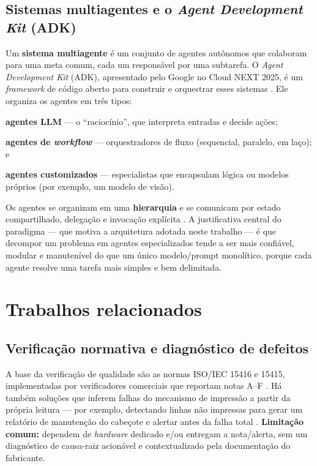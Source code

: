 \documentclass[
	article,			%
	11pt,				%
	oneside,			%
	a4paper,			%
	english,			%
	brazilian,			%
	sumario=tradicional
	]{abntex2}
\begin{document}
\subsection{Sistemas multiagentes e o \textit{Agent Development Kit} (ADK)}

Um \textbf{sistema multiagente} é um conjunto de agentes autônomos que colaboram
para uma meta comum, cada um responsável por uma subtarefa. O \textit{Agent
Development Kit} (ADK), apresentado pelo Google no Cloud NEXT 2025, é um
\textit{framework} de código aberto para construir e orquestrar esses sistemas
\cite{google_adk_blog}. Ele organiza os agentes em três tipos:
\begin{alineas}
	\item \textbf{agentes LLM} --- o ``raciocínio'', que interpreta entradas e
	decide ações;
	\item \textbf{agentes de \textit{workflow}} --- orquestradores de fluxo
	(sequencial, paralelo, em laço); e
	\item \textbf{agentes customizados} --- especialistas que encapsulam lógica ou
	modelos próprios (por exemplo, um modelo de visão).
\end{alineas}

Os agentes se organizam em uma \textbf{hierarquia} e se comunicam por estado
compartilhado, delegação e invocação explícita \cite{adk_docs}. A justificativa
central do paradigma --- que motiva a arquitetura adotada neste trabalho --- é que
decompor um problema em agentes especializados tende a ser mais confiável, modular
e manutenível do que um único modelo/prompt monolítico, porque cada agente resolve
uma tarefa mais simples e bem delimitada.

\section{Trabalhos relacionados}\label{sec-relacionados}

\subsection{Verificação normativa e diagnóstico de defeitos}

A base da verificação de qualidade são as normas ISO/IEC 15416 e 15415,
implementadas por verificadores comerciais que reportam notas A--F
\cite{iso15416,iso15415}. Há também soluções que inferem falhas do mecanismo de
impressão a partir da própria leitura --- por exemplo, detectando linhas não
impressas para gerar um relatório de manutenção do cabeçote e alertar antes da
falha total \cite{patent9826106}. \textbf{Limitação comum:} dependem de
\textit{hardware} dedicado e/ou entregam a nota/alerta, sem um diagnóstico de
causa-raiz acionável e contextualizado pela documentação do fabricante.
\end{document}
